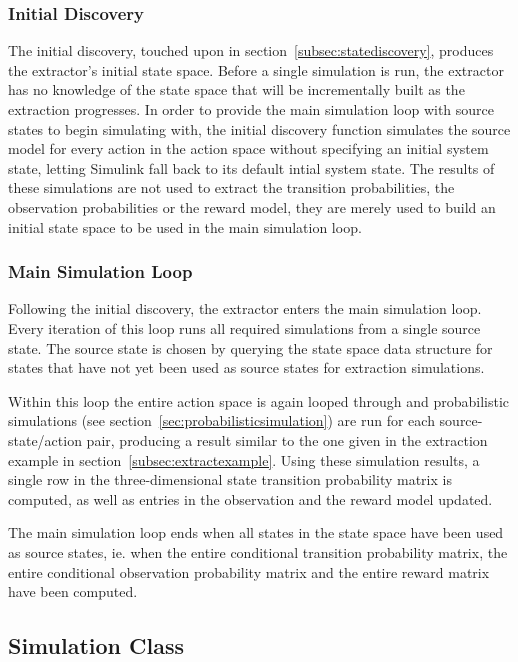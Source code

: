 \subsubsection{Initial Discovery}

The initial discovery, touched upon in section~\ref{subsec:statediscovery}, produces the extractor's initial state space. Before a single simulation is run, the extractor has no knowledge of the state space that will be incrementally built as the extraction progresses. In order to provide the main simulation loop with source states to begin simulating with, the initial discovery function simulates the source model for every action in the action space without specifying an initial system state, letting Simulink fall back to its default intial system state. The results of these simulations are not used to extract the transition probabilities, the observation probabilities or the reward model, they are merely used to build an initial state space to be used in the main simulation loop.

\subsubsection{Main Simulation Loop}
\label{subsec:implextrsimloop}

Following the initial discovery, the extractor enters the main simulation loop. Every iteration of this loop runs all required simulations from a single source state. The source state is chosen by querying the state space data structure for states that have not yet been used as source states for extraction simulations.

Within this loop the entire action space is again looped through and probabilistic simulations (see section~\ref{sec:probabilisticsimulation}) are run for each source-state/action pair, producing a result similar to the one given in the extraction example in section~\ref{subsec:extractexample}. Using these simulation results, a single row in the three-dimensional state transition probability matrix is computed, as well as entries in the observation and the reward model updated. 

The main simulation loop ends when all states in the state space have been used as source states, ie. when the entire conditional transition probability matrix, the entire conditional observation probability matrix and the entire reward matrix have been computed.

\subsection{Simulation Class}
\label{subsec:implextrsim}

